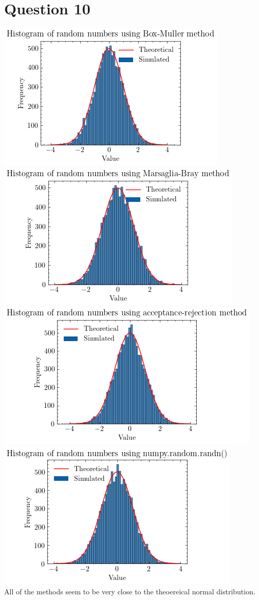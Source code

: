 \documentclass{article}
\begin{document}
\section*{Question 10}
\includegraphics[scale=0.7]{imgs/boxmuller.png}  \\
\includegraphics[scale=0.7]{imgs/marsagliabray.png}  \\
\includegraphics[scale=0.7]{imgs/acceptancerejection.png}  \\
\includegraphics[scale=0.7]{imgs/numpyrandomrv.png}  \\

All of the methods seem to be very close to the theoereical normal distribution. 
\end{document}
